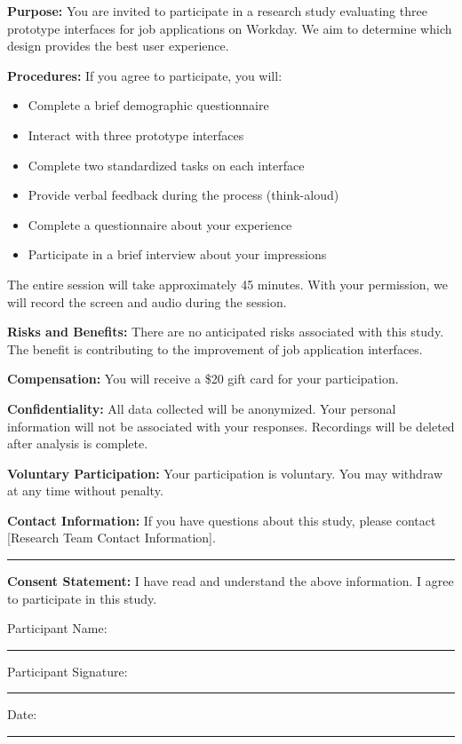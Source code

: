\documentclass[
	letterpaper, %
]{jdf}
\begin{document}
\textbf{Purpose:} You are invited to participate in a research study evaluating three prototype interfaces for job applications on Workday. We aim to determine which design provides the best user experience.

\textbf{Procedures:} If you agree to participate, you will:
\begin{itemize}
    \item Complete a brief demographic questionnaire
    \item Interact with three prototype interfaces
    \item Complete two standardized tasks on each interface
    \item Provide verbal feedback during the process (think-aloud)
    \item Complete a questionnaire about your experience
    \item Participate in a brief interview about your impressions
\end{itemize}

The entire session will take approximately 45 minutes. With your permission, we will record the screen and audio during the session.

\textbf{Risks and Benefits:} There are no anticipated risks associated with this study. The benefit is contributing to the improvement of job application interfaces.

\textbf{Compensation:} You will receive a \$20 gift card for your participation.

\textbf{Confidentiality:} All data collected will be anonymized. Your personal information will not be associated with your responses. Recordings will be deleted after analysis is complete.

\textbf{Voluntary Participation:} Your participation is voluntary. You may withdraw at any time without penalty.

\textbf{Contact Information:} If you have questions about this study, please contact [Research Team Contact Information].

\vspace{0.5cm}
\rule{8cm}{0.5pt}

\textbf{Consent Statement:} I have read and understand the above information. I agree to participate in this study.

\vspace{0.5cm}
Participant Name: \rule{8cm}{0.5pt}

Participant Signature: \rule{8cm}{0.5pt}

Date: \rule{4cm}{0.5pt}
\end{document}
